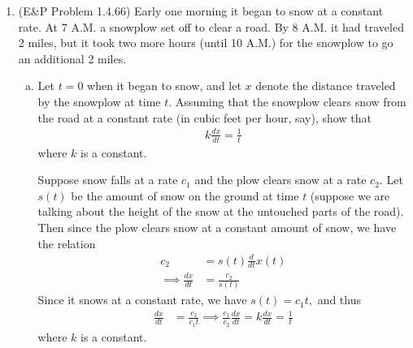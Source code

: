 \documentclass{article}
\begin{document}
\begin{enumerate}
	\item (E\&P Problem 1.4.66) Early one morning it began to snow at a constant rate. At 7 A.M. a snowplow set off to clear a road. By 8 A.M. it had traveled 2 miles, but it took two more hours (until 10 A.M.) for the snowplow to go an additional 2 miles.
		\begin{enumerate}[(a)]
			\item Let $t=0$ when it began to snow, and let $x$ denote the distance traveled by the snowplow at time $t.$ Assuming that the snowplow clears snow from the road at a constant rate (in cubic feet per hour, say), show that
				\begin{align*}
					k\frac{dx}{dt} = \frac{1}{t}
				\end{align*}
				where $k$ is a constant.
				\begin{soln}
					Suppose snow falls at a rate $c_1$ and the plow clears snow at a rate $c_2.$ Let $s(t)$ be the amount of snow on the ground at time $t$ (suppose we are talking about the height of the snow at the untouched parts of the road). Then since the plow clears snow at a constant amount of snow, we have the relation
					\begin{align*}
						c_2 &= s(t) \frac{d}{dt} x(t) \\
						\implies \frac{dx}{dt} &= \frac{c_2}{s(t)}
					\end{align*}
					Since it snows at a constant rate, we have $s(t)=c_1t,$ and thus
					\begin{align*}
						\frac{dx}{dt} &= \frac{c_2}{c_1t} \implies \frac{c_1}{c_2}\frac{dx}{dt} = k\frac{dx}{dt} = \frac{1}{t}
					\end{align*}
					where $k$ is a constant.
				\end{soln}


\end{enumerate}
\end{enumerate}
\end{document}
